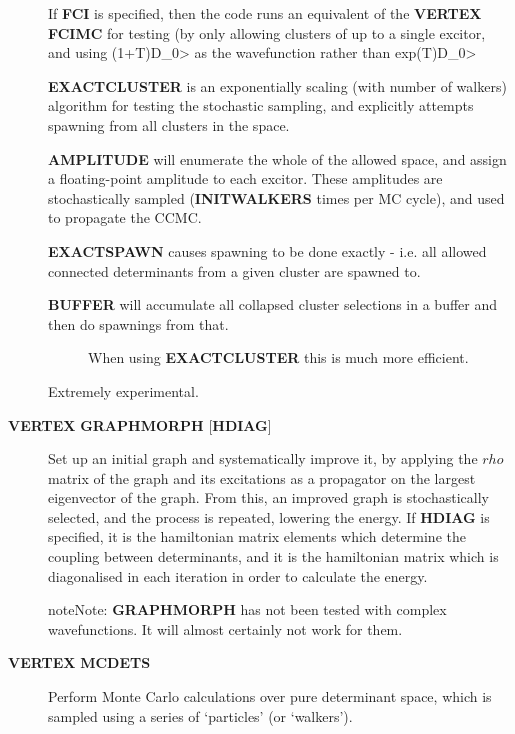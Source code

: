 \documentclass[openany,a4paper,10pt,english]{manual}
\begin{document}
\begin{description}
If \textbf{FCI} is specified, then the code runs an equivalent of the \textbf{VERTEX} \textbf{FCIMC}
for testing (by only allowing clusters of up to a single excitor, and using (1+T)\textbar{}D\_0\textgreater{}
as the wavefunction rather than exp(T)\textbar{}D\_0\textgreater{}

\textbf{EXACTCLUSTER} is an exponentially scaling (with number of walkers) algorithm for testing
the stochastic sampling, and explicitly attempts spawning from all clusters in the space.

\textbf{AMPLITUDE} will enumerate the whole of the allowed space, and assign a floating-point
amplitude to each excitor.  These amplitudes are stochastically sampled (\textbf{INITWALKERS}
times per MC cycle), and used to propagate the CCMC.

\textbf{EXACTSPAWN} causes spawning to be done exactly - i.e. all allowed connected determinants
from a given cluster are spawned to.
\begin{description}
\item[\textbf{BUFFER} will accumulate all collapsed cluster selections in a buffer and then do spawnings from that.] \leavevmode
When using \textbf{EXACTCLUSTER} this is much more efficient.

\end{description}

Extremely experimental.

\item[\textbf{VERTEX} \textbf{GRAPHMORPH} {[}\textbf{HDIAG}{]}] \leavevmode
Set up an initial graph and systematically improve it, by applying the
$rho$ matrix of the graph and its excitations as a propagator
on the largest eigenvector of the graph. From this, an improved graph
is stochastically selected, and the process is repeated, lowering
the energy. If \textbf{HDIAG} is specified, it is the hamiltonian matrix
elements which determine the coupling between determinants, and it
is the hamiltonian matrix which is diagonalised in each iteration
in order to calculate the energy.

\begin{notice}{note}{Note:}
\textbf{GRAPHMORPH} has not been tested with complex wavefunctions.  It will
almost certainly not work for them.
\end{notice}

\item[\textbf{VERTEX} \textbf{MCDETS}] \leavevmode
Perform Monte Carlo calculations over pure determinant space, which
is sampled using a series of `particles' (or `walkers').


\end{description}
\end{document}

